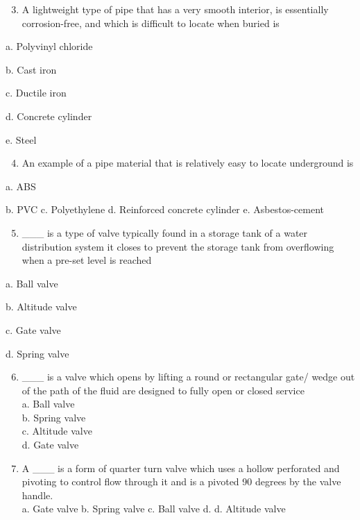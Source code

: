 \documentclass[10pt]{article}
\begin{document}
\begin{enumerate}
\begin{enumerate}
\begin{enumerate}
  \setcounter{enumi}{2}
  \item A lightweight type of pipe that has a very smooth interior, is essentially corrosion-free, and which is difficult to locate when buried is
\end{enumerate}

a. Polyvinyl chloride

b. Cast iron

c. Ductile iron

d. Concrete cylinder

e. Steel

\begin{enumerate}
  \setcounter{enumi}{3}
  \item An example of a pipe material that is relatively easy to locate underground is
\end{enumerate}

a. ABS

b. PVC
c. Polyethylene
d. Reinforced concrete cylinder
e. Asbestos-cement

\begin{enumerate}
  \setcounter{enumi}{4}
  \item \_\_\_ is a type of valve typically found in a storage tank of a water distribution system it closes to prevent the storage tank from overflowing when a pre-set level is reached\\
\end{enumerate}

a. Ball valve

b. Altitude valve

c. Gate valve

d. Spring valve

\begin{enumerate}
  \setcounter{enumi}{5}
  \item \_\_\_ is a valve which opens by lifting a round or rectangular gate/ wedge out of the path of the fluid are designed to fully open or closed service\\
a. Ball valve\\
b. Spring valve\\
c. Altitude valve\\
d. Gate valve\\

  \item A \_\_\_ is a form of quarter turn valve which uses a hollow perforated and pivoting to control flow through it and is a pivoted 90 degrees by the valve handle.\\
a. Gate valve
b. Spring valve
c. Ball valve
d. d. Altitude valve


\end{enumerate}
\end{enumerate}
\end{enumerate}
\end{document}
